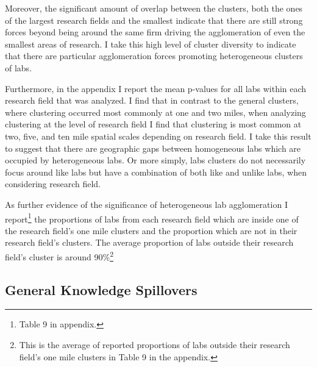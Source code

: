 \documentclass[12pt,letterpaper]{article}
\begin{document}
\par
Moreover, the significant amount of overlap between the clusters, both the ones of the largest research fields and the smallest indicate that there are still strong forces beyond being around the same firm driving the agglomeration of even the smallest areas of research. I take this high level of cluster diversity to indicate that there are particular agglomeration forces promoting heterogeneous clusters of labs. 
\par 
Furthermore, in the appendix I report the mean p-values for all labs within each research field that was analyzed. I find that in contrast to the general clusters, where clustering occurred most commonly at one and two miles, when analyzing clustering at the level of research field I find that clustering is most common at two, five, and ten mile spatial scales depending on research field. I take this result to suggest that there are geographic gaps between homogeneous labs which are occupied by heterogeneous labs. Or more simply, labs clusters do not necessarily focus around like labs but have a combination of both like and unlike labs, when considering research field. 
\par
As further evidence of the significance of heterogeneous lab agglomeration I report\footnote{Table 9 in appendix.} the proportions of labs from each research field which are inside one of the research field's one mile clusters and the proportion which are not in their research field's clusters. The average proportion of labs outside their research field's cluster is around 90\%\footnote{This is the average of reported proportions of labs outside their research field's one mile clusters in Table 9 in the appendix.} 

\subsection{General Knowledge Spillovers}
 
\end{document}
